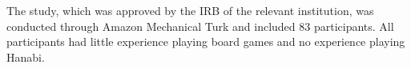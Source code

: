 \documentclass[letterpaper]{article} %
\begin{document}
 








The study, which was approved by the IRB of the relevant institution, was conducted through Amazon Mechanical Turk and included 83 participants. All participants had little experience playing board games and no experience playing Hanabi.
\end{document}
